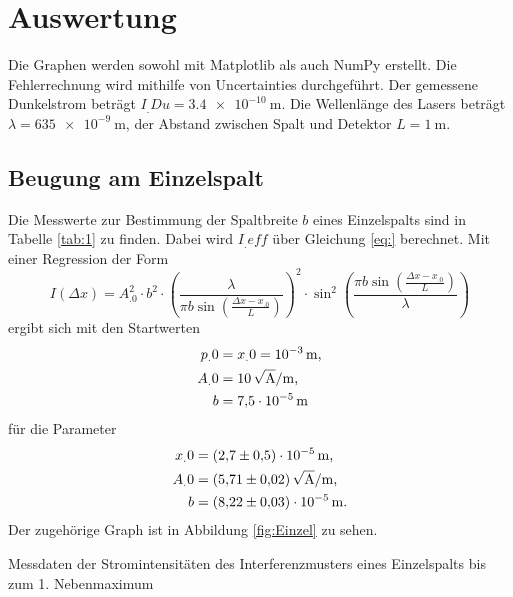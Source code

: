 \section{Auswertung}
\label{sec:Auswertung}


Die Graphen werden sowohl mit Matplotlib \cite{matplotlib} als auch NumPy \cite{numpy} erstellt. Die Fehlerrechnung wird mithilfe von Uncertainties \cite{uncertainties} 
durchgeführt.
\newline\newline
Der gemessene Dunkelstrom beträgt $I_.{Du}=\SI{3,4e-10}{\metre}$.
Die Wellenlänge des Lasers beträgt $\lambda = \SI{635e-9}{\metre}$, der Abstand zwischen Spalt und Detektor $L=\SI{1}{\metre}$.
\subsection{Beugung am Einzelspalt}

Die Messwerte zur Bestimmung der Spaltbreite $b$ eines Einzelspalts sind in Tabelle \ref{tab:1} zu finden. Dabei wird $I_.{eff}$ über Gleichung \eqref{eq:} berechnet.
Mit einer Regression der Form 
\[
I(\Delta x)=A^2_.0\cdot b^2\cdot\left(
\frac{\lambda}{\pi b \sin{\left(\frac{\Delta x-x_.0}{L}\right)}}\right)^2\cdot\sin^2{\left(\frac{\pi b\sin{\left(\frac{\Delta x-x_.0}{L}\right)}}{\lambda}\right)}
\]
ergibt sich mit den Startwerten
\begin{align*}
p_.0 	&= x_.0=\SI{e-3}{\metre}\text{,}\\
A_.0	&=\SI{10}{\sqrt{\ampere}\per\metre}\text{,}\\
b		&=\SI{7,5e-5}{\metre}\\
\end{align*}
für die Parameter
\begin{align*}
x_.0&= \SI{2,7(5)e-5}{\metre}\text{,} \\
A_.0&= \SI{5,71(2)}{\sqrt{\ampere}\per\metre}\text{,} \\
b   &= \SI{8,22(3)e-5}{\metre}\text{.} \\
\end{align*}
Der zugehörige Graph ist in Abbildung \ref{fig:Einzel} zu sehen.

\begin{table}
\caption{Messdaten der Stromintensitäten des Interferenzmusters eines Einzelspalts bis zum 1. Nebenmaximum}


\label{tab:1}
\end{table}

